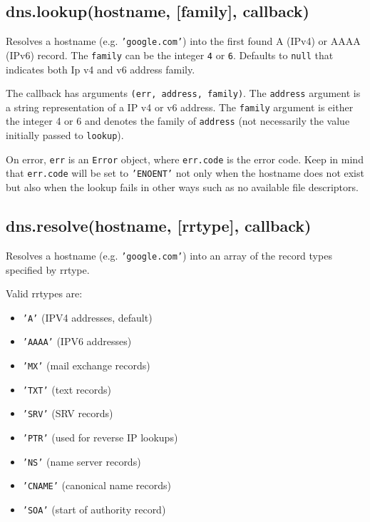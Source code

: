 \subsection{dns.lookup(hostname, {[}family{]},
callback)}\label{dns.lookuphostname-family-callback}

Resolves a hostname (e.g. \texttt{'google.com'}) into the first found A
(IPv4) or AAAA (IPv6) record. The \texttt{family} can be the integer
\texttt{4} or \texttt{6}. Defaults to \texttt{null} that indicates both
Ip v4 and v6 address family.

The callback has arguments \texttt{(err, address, family)}. The
\texttt{address} argument is a string representation of a IP v4 or v6
address. The \texttt{family} argument is either the integer 4 or 6 and
denotes the family of \texttt{address} (not necessarily the value
initially passed to \texttt{lookup}).

On error, \texttt{err} is an \texttt{Error} object, where
\texttt{err.code} is the error code. Keep in mind that \texttt{err.code}
will be set to \texttt{'ENOENT'} not only when the hostname does not
exist but also when the lookup fails in other ways such as no available
file descriptors.

\subsection{dns.resolve(hostname, {[}rrtype{]},
callback)}\label{dns.resolvehostname-rrtype-callback}

Resolves a hostname (e.g. \texttt{'google.com'}) into an array of the
record types specified by rrtype.

Valid rrtypes are:

\begin{itemize}
\itemsep1pt\parskip0pt
\item
  \texttt{'A'} (IPV4 addresses, default)
\item
  \texttt{'AAAA'} (IPV6 addresses)
\item
  \texttt{'MX'} (mail exchange records)
\item
  \texttt{'TXT'} (text records)
\item
  \texttt{'SRV'} (SRV records)
\item
  \texttt{'PTR'} (used for reverse IP lookups)
\item
  \texttt{'NS'} (name server records)
\item
  \texttt{'CNAME'} (canonical name records)
\item
  \texttt{'SOA'} (start of authority record)
\end{itemize}

